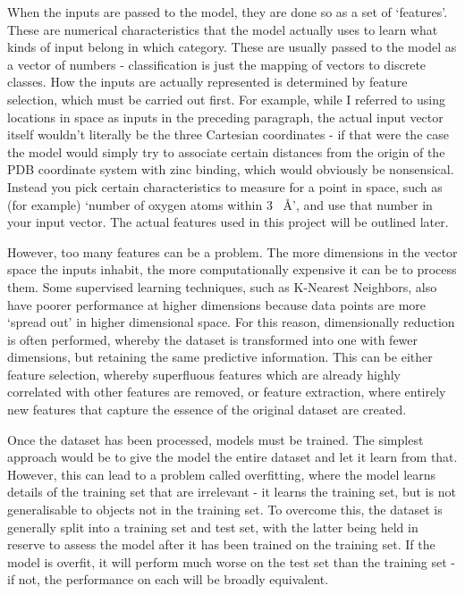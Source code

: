 When the inputs are passed to the model, they are done so as a set of `features'. These are numerical characteristics that the model actually uses to learn what kinds of input belong in which category. These are usually passed to the model as a vector of numbers - classification is just the mapping of vectors to discrete classes. How the inputs are actually represented is determined by feature selection, which must be carried out first. For example, while I referred to using locations in space as inputs in the preceding paragraph, the actual input vector itself wouldn't literally be the three Cartesian coordinates - if that were the case the model would simply try to associate certain distances from the origin of the PDB coordinate system with zinc binding, which would obviously be nonsensical. Instead you pick certain characteristics to measure for a point in space, such as (for example) `number of oxygen atoms within 3 ~{\AA}', and use that number in your input vector. The actual features used in this project will be outlined later.

However, too many features can be a problem. The more dimensions in the vector space the inputs inhabit, the more computationally expensive it can be to process them. Some supervised learning techniques, such as K-Nearest Neighbors, also have poorer performance at higher dimensions because data points are more `spread out' in higher dimensional space. For this reason, dimensionally reduction is often performed, whereby the dataset is transformed into one with fewer dimensions, but retaining the same predictive information. This can be either feature selection, whereby superfluous features which are already highly correlated with other features are removed, or feature extraction, where entirely new features that capture the essence of the original dataset are created.

Once the dataset has been processed, models must be trained. The simplest approach would be to give the model the entire dataset and let it learn from that. However, this can lead to a problem called overfitting, where the model learns details of the training set that are irrelevant - it learns the training set, but is not generalisable to objects not in the training set. To overcome this, the dataset is generally split into a training set and test set, with the latter being held in reserve to assess the model after it has been trained on the training set. If the model is overfit, it will perform much worse on the test set than the training set - if not, the performance on each will be broadly equivalent.

